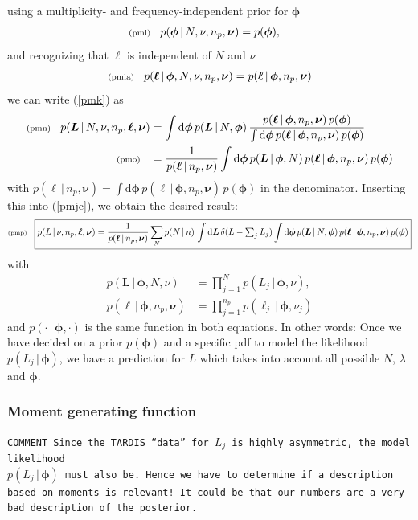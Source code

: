 \documentclass[11pt]{article}
\newcommand{\lleq}[1]{\label{#1} }
\renewcommand{\lleq}[1]{\label{#1} {\scriptstyle {\rm (#1)}} \hspace*{2ex} }
\newcommand{\cond}{\,|\,}
\newcommand{\bml}{{\bm{\ell}}}
\newcommand{\bmL}{{\bm{L}}}
\newcommand{\bmphi}{{\bm{\phi}}}
\newcommand{\bmnu}{{\bm{\nu}}}
\newcommand{\npack}{n_p}
\newcommand{\rmdx}[1]{\mbox{d} #1 \,} %
\begin{document}
using a multiplicity- and frequency-independent prior for $\bmphi$
\begin{align}
  \lleq{pml}
  p(\bmphi\cond N,\nu, \npack,\bmnu) &= p(\bmphi),
\end{align}
and recognizing that $\bml$ is independent of $N$ and $\nu$
\begin{align}
  \lleq{pmla}
  p(\bml\cond \bmphi,N,\nu, \npack,\bmnu) = p(\bml\cond \bmphi,\npack,\bmnu)
\end{align}
we can write (\ref{pmk}) as
\begin{align}
  \lleq{pmn}
  p(\bmL\cond N,\nu, \npack,\bml, \bmnu)
  &= \int \rmdx{\bmphi} p(\bmL\cond N,\bmphi)\, %
  \frac{p(\bml\cond \bmphi, \npack, \bmnu)\,p(\bmphi)} %
  {\int \rmdx{\bmphi} p(\bml\cond \bmphi,\npack,\bmnu)\,p(\bmphi)} \\
  \lleq{pmo}
  &= \frac{1}  {p(\bml\cond \npack, \bmnu)} %
  \int \rmdx{\bmphi} p(\bmL\cond \bmphi, N)\, %
  p(\bml\cond \bmphi, \npack,\bmnu)\,p(\bmphi)
\end{align}
with $p(\bml\cond \npack, \bmnu) = \int \rmdx{\bmphi} p(\bml\cond \bmphi,
\npack,\bmnu)\,p(\bmphi)$ in the denominator.  Inserting this into
(\ref{pmjc}), we obtain the desired result:
\begin{equation}
  \lleq{pmp}
  \boxed{
  p(L\cond \nu, \npack,\bml, \bmnu)
  = \frac{1}{p(\bml\cond \npack, \bmnu)}
  \sum_N p(N\cond n)\,\int \rmdx{\bmL} \delta(L - \textstyle\sum_j L_j)
  \displaystyle\int \rmdx{\bmphi} p(\bmL\cond N,\bmphi) \, p(\bml\cond \bmphi,\npack,\bmnu)
  \, p(\bmphi)
  }
\end{equation}
with
\begin{align}
  p(\bmL\cond \bmphi, N, \nu) &= \prod_{j=1}^N p(L_j\cond \bmphi, \nu), \\
  p(\bml\cond \bmphi,\npack,\bmnu) &= \prod_{j=1}^{\npack} p(\ell_j\cond \bmphi, \nu_j)
\end{align}
and $p(\cdot \cond \bmphi, \cdot)$ is the same function in both equations.
In other words: Once we have decided on a prior $p(\bmphi)$ and a
specific pdf to model the likelihood $p(L_j\cond \bmphi)$, we have a
prediction for $L$ which takes into account all possible $N$,
$\lambda$ and $\bmphi$.

\subsubsection{Moment generating function}
\label{sec:mgff}

\texttt{COMMENT Since the TARDIS ``data'' for $L_j$ is highly
  asymmetric, the model likelihood\\ $p(L_j\cond \bmphi)$ must also
  be. Hence we have to determine if a description based on moments is
  relevant! It could be that our numbers are a very bad description of
  the posterior.}
\\
\end{document}
